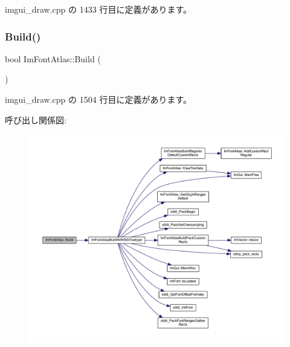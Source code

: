  imgui\+\_\+draw.\+cpp の 1433 行目に定義があります。

\mbox{\label{struct_im_font_atlas_a81e39e30dffa4dd7e458a53297451e27}} 
\subsubsection{\texorpdfstring{Build()}{Build()}}
{\footnotesize\ttfamily bool Im\+Font\+Atlas\+::\+Build (\begin{DoxyParamCaption}{ }\end{DoxyParamCaption})}



 imgui\+\_\+draw.\+cpp の 1504 行目に定義があります。

呼び出し関係図\+:\nopagebreak
\begin{figure}[H]
\begin{center}
\leavevmode
\includegraphics[width=350pt]{struct_im_font_atlas_a81e39e30dffa4dd7e458a53297451e27_cgraph}
\end{center}
\end{figure}
\mbox{\label{struct_im_font_atlas_a70e062104b11a213eb3d177151c418e2}} 
